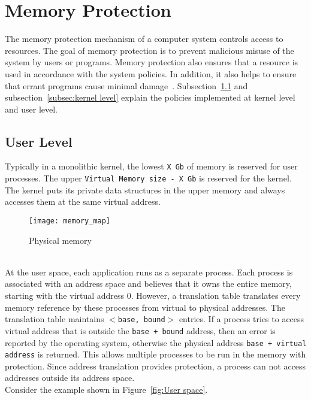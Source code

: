 \section{Memory Protection}
The memory protection mechanism of a computer system controls access to resources. The goal of memory protection is to prevent malicious misuse of the system by users or programs. Memory protection also ensures that a resource is used in accordance with the system policies. In addition, it also helps to ensure that errant programs cause minimal damage~\cite{Galvin, Graham:1971:PPP:1478873.1478928}. Subsection~\ref{subsec:user level} and subsection~\ref{subsec:kernel level} explain the policies implemented at kernel level and user level. 

\subsection{User Level}
\label{subsec:user level}
Typically in a monolithic kernel, the lowest \texttt{X Gb} of memory is reserved for user processes. The upper \texttt{Virtual Memory size - X Gb} is reserved for the kernel. The kernel puts its private data structures in the upper memory and always accesses them at the same virtual address. 
\begin{figure}[!ht]
\centering
\texttt{[image: memory\_map]}
\caption{Physical memory}
\label{fig:memmap}
\end{figure}
\\[3mm]
At the user space, each application runs as a separate process. Each process is associated with an address space and believes that it owns the entire memory, starting with the virtual address 0. However, a translation table translates every memory reference by these processes from virtual to physical addresses. The translation table maintains \texttt{$<$base, bound$>$} entries. If a process tries to access virtual address that is outside the \texttt{base + bound} address, then an error is reported by the operating system, otherwise the physical address \texttt{base + virtual address} is returned. This allows multiple processes to be run in the memory with protection. Since address translation provides protection, a process can not access addresses outside its address space.
\\[3mm]
Consider the example shown in Figure~\ref{fig:User space}.
